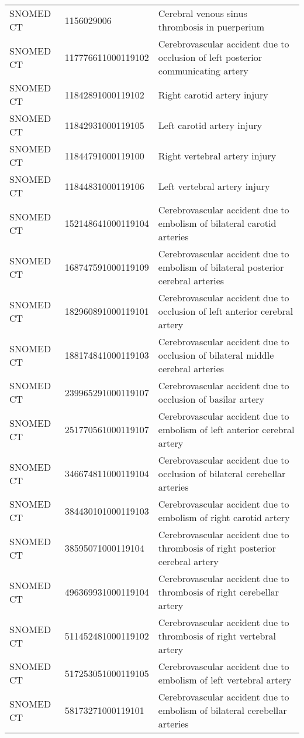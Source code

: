 \begin{longtable}{p{}p{}p{}}
  SNOMED CT & 1156029006 & Cerebral venous sinus thrombosis in puerperium \\ 
  SNOMED CT & 117776611000119102 & Cerebrovascular accident due to occlusion of left posterior communicating artery \\ 
  SNOMED CT & 11842891000119102 & Right carotid artery injury \\ 
  SNOMED CT & 11842931000119105 & Left carotid artery injury \\ 
  SNOMED CT & 11844791000119100 & Right vertebral artery injury \\ 
  SNOMED CT & 11844831000119106 & Left vertebral artery injury \\ 
  SNOMED CT & 152148641000119104 & Cerebrovascular accident due to embolism of bilateral carotid arteries \\ 
  SNOMED CT & 168747591000119109 & Cerebrovascular accident due to embolism of bilateral posterior cerebral arteries \\ 
  SNOMED CT & 182960891000119101 & Cerebrovascular accident due to occlusion of left anterior cerebral artery \\ 
  SNOMED CT & 188174841000119103 & Cerebrovascular accident due to occlusion of bilateral middle cerebral arteries \\ 
  SNOMED CT & 239965291000119107 & Cerebrovascular accident due to occlusion of basilar artery \\ 
  SNOMED CT & 251770561000119107 & Cerebrovascular accident due to embolism of left anterior cerebral artery \\ 
  SNOMED CT & 346674811000119104 & Cerebrovascular accident due to occlusion of bilateral cerebellar arteries \\ 
  SNOMED CT & 384430101000119103 & Cerebrovascular accident due to embolism of right carotid artery \\ 
  SNOMED CT & 38595071000119104 & Cerebrovascular accident due to thrombosis of right posterior cerebral artery \\ 
  SNOMED CT & 496369931000119104 & Cerebrovascular accident due to thrombosis of right cerebellar artery \\ 
  SNOMED CT & 511452481000119102 & Cerebrovascular accident due to thrombosis of right vertebral artery \\ 
  SNOMED CT & 517253051000119105 & Cerebrovascular accident due to embolism of left vertebral artery \\ 
  SNOMED CT & 58173271000119101 & Cerebrovascular accident due to embolism of bilateral cerebellar arteries \\ 

\end{longtable}
